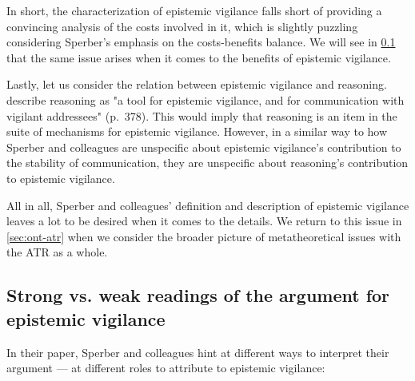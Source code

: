 In short, the characterization of epistemic vigilance falls short of providing a convincing analysis of the costs involved in it, which is slightly puzzling considering Sperber's emphasis on the costs-benefits balance. We will see in \cref{sec:strong-weak} that the same issue arises when it comes to the benefits of epistemic vigilance.

Lastly, let us consider the relation between epistemic vigilance and reasoning. \citet{Sperber10} describe reasoning as "a tool for epistemic vigilance, and for communication with vigilant addressees" (p.~378). This would imply that reasoning is an item in the suite of mechanisms for epistemic vigilance. However, in a similar way to how Sperber and colleagues are unspecific about epistemic vigilance's contribution to the stability of communication, they are unspecific about reasoning's contribution to epistemic vigilance.

All in all, Sperber and colleagues' definition and description of epistemic vigilance leaves a lot to be desired when it comes to the details. We return to this issue in \cref{sec:ont-atr} when we consider the broader picture of metatheoretical issues with the ATR as a whole.

\subsection{Strong vs. weak readings of the argument for epistemic vigilance}
\label{sec:strong-weak}

In their \citeyear{Sperber10} paper, Sperber and colleagues hint at different ways to interpret their argument --- at different roles to attribute to epistemic vigilance:

